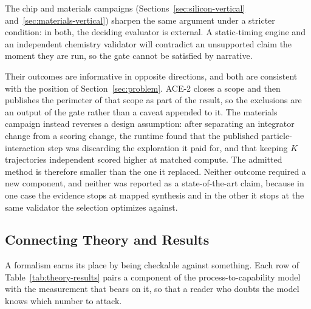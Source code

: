 The chip and materials campaigns (Sections~\ref{sec:silicon-vertical}
and~\ref{sec:materials-vertical}) sharpen the same argument under a stricter
condition: in both, the deciding evaluator is external. A static-timing engine and
an independent chemistry validator will contradict an unsupported claim the moment
they are run, so the gate cannot be satisfied by narrative.

Their outcomes are informative in opposite directions, and both are consistent with
the position of Section~\ref{sec:problem}. ACE-2 closes a scope and then publishes
the perimeter of that scope as part of the result, so the exclusions are an output of
the gate rather than a caveat appended to it. The materials campaign instead reverses
a design assumption: after separating an integrator change from a scoring change, the
runtime found that the published particle-interaction step was discarding the
exploration it paid for, and that keeping $K$ trajectories independent scored higher
at matched compute. The admitted method is therefore smaller than the one it replaced.
Neither outcome required a new component, and neither was reported as a
state-of-the-art claim, because in one case the evidence stops at mapped synthesis and
in the other it stops at the same validator the selection optimizes against.

\subsection{Connecting Theory and Results}

A formalism earns its place by being checkable against something. Each row of
Table~\ref{tab:theory-results} pairs a component of the process-to-capability model
with the measurement that bears on it, so that a reader who doubts the model knows
which number to attack.


